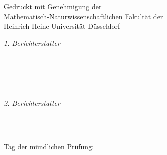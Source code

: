% 
\vfill
{\large
Gedruckt mit Genehmigung der\\
Mathematisch-Naturwissenschaftlichen Fakult{\"a}t der\\
Heinrich-Heine-Universit{\"a}t Düsseldorf
}
\vfill
{
\begin{minipage}[t]{.35\textwidth}
	\raggedleft
	\textit{1. Berichterstatter}
\end{minipage}
\hspace*{15pt}
\begin{minipage}[t]{.65\textwidth}
	{\Large \thesisFirstReviewer} \\
	  {\small \thesisFirstReviewerDepartment} \\[-1mm]
	{\small \thesisFirstReviewerUniversity}
\end{minipage} \\[5mm]
\begin{minipage}[t]{.35\textwidth}
	\raggedleft
	\textit{2. Berichterstatter}
\end{minipage}
\hspace*{15pt}
\begin{minipage}[t]{.65\textwidth}
	{\Large \thesisSecondReviewer} \\
	  {\small \thesisSecondReviewerDepartment} \\[-1mm]
	{\small \thesisSecondReviewerUniversity}
\end{minipage}
}
% 
\vfill
{\large Tag der m{\"u}ndlichen Pr{\"u}fung:}
% 
\hfill
\vfill